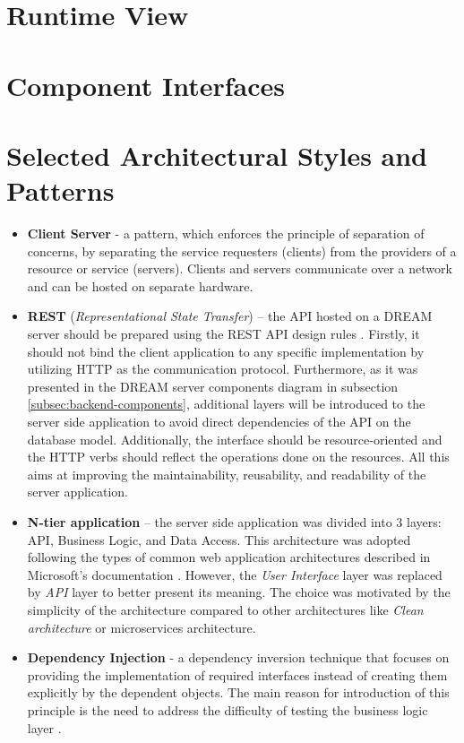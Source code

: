 \section{Runtime View}

\section{Component Interfaces}

\section{Selected Architectural Styles and Patterns}\label{sec:patterns}
\begin{itemize}
    \item \textbf{Client Server} - a pattern, which enforces the principle of separation of concerns, by separating the service requesters (clients) from the providers of a resource or service (servers). Clients and servers communicate over a network and can be hosted on separate hardware.
    \item \textbf{REST} (\textit{Representational State Transfer}) – the API hosted on a DREAM server should be prepared using the REST API design rules \cite{rest} \cite{rest-microsoft}. Firstly, it should not bind the client application to any specific implementation by utilizing HTTP as the communication protocol. Furthermore, as it was presented in the DREAM server components diagram in subsection \ref{subsec:backend-components}, additional layers will be introduced to the server side application to avoid direct dependencies of the API on the database model. Additionally, the interface should be resource-oriented and the HTTP verbs  should reflect the operations done on the resources. All this aims at improving the maintainability, reusability, and readability of the server application.
    \item \textbf{N-tier application} – the server side application was divided into 3 layers: API, Business Logic, and Data Access. This architecture was adopted following the types of common web application architectures described in Microsoft's documentation \cite{ntier}. However, the \textit{User Interface} layer was replaced by \textit{API} layer to better present its meaning. The choice was motivated by the simplicity of the architecture compared to other architectures like \textit{Clean architecture} or microservices architecture. 
    \item \textbf{Dependency Injection} - a dependency inversion technique that focuses on providing the implementation of required interfaces instead of creating them explicitly by the dependent objects. The main reason for introduction of this principle is the need to address the difficulty of testing the business logic layer \cites{ntier} \cite{di}. 
\end{itemize}

